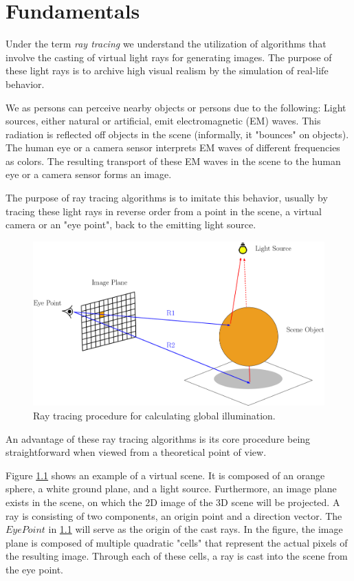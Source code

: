 \chapter{Fundamentals}
\label{chap:fundamentals}

Under the term \emph{ray tracing} we understand the utilization of algorithms that involve the casting of virtual light rays for generating images. The purpose of these light rays is to archive high visual realism by the simulation of real-life behavior.

We as persons can perceive nearby objects or persons due to the following: Light sources, either natural or artificial, emit electromagnetic (EM) waves. This radiation is reflected off objects in the scene (informally, it "bounces" on objects). The human eye or a camera sensor interprets EM waves of different frequencies as colors. The resulting transport of these EM waves in the scene to the human eye or a camera sensor forms an image.

The purpose of ray tracing algorithms is to imitate this behavior, usually by tracing these light rays in reverse order from a point in the scene, a virtual camera or an "eye point", back to the emitting light source.

\begin{figure}[h]
	\centering
	\includegraphics[width=.9\linewidth]{img/1 fundamentals/ray_tracing.png}
	\caption{Ray tracing procedure for calculating global illumination.}
	\label{fig:raytracer_general}
\end{figure}

An advantage of these ray tracing algorithms is its core procedure being straightforward when viewed from a theoretical point of view. 

Figure \ref{fig:raytracer_general} shows an example of a virtual scene. It is composed of an orange sphere, a white ground plane, and a light source. Furthermore, an image plane exists in the scene, on which the 2D image of the 3D scene will be projected. 
A ray is consisting of two components, an origin point and a direction vector. The $Eye Point$ in \ref{fig:raytracer_general} will serve as the origin of the cast rays. In the figure, the image plane is composed of multiple quadratic "cells" that represent the actual pixels of the resulting image. Through each of these cells, a ray is cast into the scene from the eye point. 

